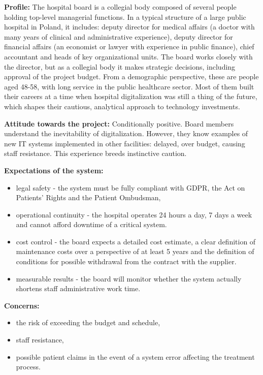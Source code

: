\textbf{Profile:} The hospital board is a collegial body composed of several people holding top-level managerial functions. In a typical structure of a large public hospital in Poland, it includes: deputy director for medical affairs (a doctor with many years of clinical and administrative experience), deputy director for financial affairs (an economist or lawyer with experience in public finance), chief accountant and heads of key organizational units. The board works closely with the director, but as a collegial body it makes strategic decisions, including approval of the project budget.
From a demographic perspective, these are people aged 48-58, with long service in the public healthcare sector. Most of them built their careers at a time when hospital digitalization was still a thing of the future, which shapes their cautious, analytical approach to technology investments.

\textbf{Attitude towards the project:} Conditionally positive. Board members understand the inevitability of digitalization. However, they know examples of new IT systems implemented in other facilities: delayed, over budget, causing staff resistance. This experience breeds instinctive caution.

\textbf{Expectations of the system:}
\begin{itemize}
    \item legal safety - the system must be fully compliant with GDPR, the Act on Patients' Rights and the Patient Ombudsman,
    \item operational continuity - the hospital operates 24 hours a day, 7 days a week and cannot afford downtime of a critical system.
    \item cost control - the board expects a detailed cost estimate, a clear definition of maintenance costs over a perspective of at least 5 years and the definition of conditions for possible withdrawal from the contract with the supplier.
    \item measurable results - the board will monitor whether the system actually shortens staff administrative work time.
\end{itemize}

\textbf{Concerns:}
\begin{itemize}
    \item the risk of exceeding the budget and schedule,
    \item staff resistance,
    \item possible patient claims in the event of a system error affecting the treatment process.
\end{itemize}

